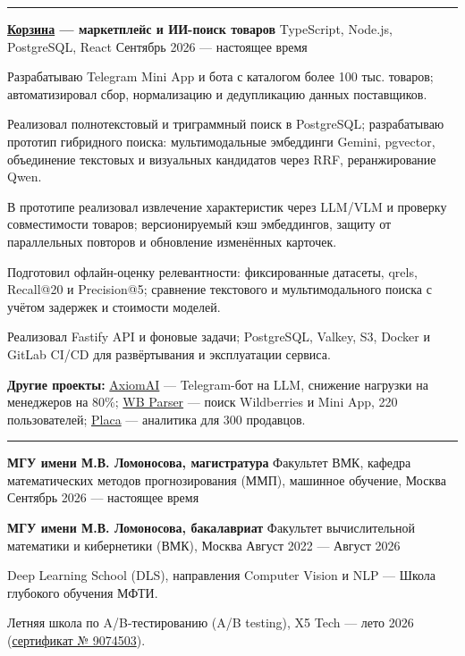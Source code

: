 \documentclass[10pt,a4paper]{article}
\newcommand{\cvsection}[1]{%
  \vspace{5pt}{\large\bfseries #1}\par\vspace{2pt}\hrule\vspace{4pt}}
\newcommand{\cventry}[3]{%
  \textbf{#1} \textbar{} #3 \textbar{} #2\par\vspace{1pt}}
\begin{document}
\cvsection{Проекты}
\cventry{\href{https://github.com/noobmaster-ru/korzina-market}{Корзина} --- маркетплейс и ИИ-поиск товаров}{Сентябрь 2026 --- настоящее время}{TypeScript, Node.js, PostgreSQL, React}
\begin{cvitems}
    \item Разрабатываю Telegram Mini App и бота с каталогом более 100 тыс. товаров; автоматизировал сбор, нормализацию и дедупликацию данных поставщиков.
    \item Реализовал полнотекстовый и триграммный поиск в PostgreSQL; разрабатываю прототип гибридного поиска: мультимодальные эмбеддинги Gemini, pgvector, объединение текстовых и визуальных кандидатов через RRF, реранжирование Qwen.
    \item В прототипе реализовал извлечение характеристик через LLM/VLM и проверку совместимости товаров; версионируемый кэш эмбеддингов, защиту от параллельных повторов и обновление изменённых карточек.
    \item Подготовил офлайн-оценку релевантности: фиксированные датасеты, qrels, Recall@20 и Precision@5; сравнение текстового и мультимодального поиска с учётом задержек и стоимости моделей.
    \item Реализовал Fastify API и фоновые задачи; PostgreSQL, Valkey, S3, Docker и GitLab CI/CD для развёртывания и эксплуатации сервиса.
\end{cvitems}
\textbf{Другие проекты:} \href{https://github.com/noobmaster-ru/axiomai}{AxiomAI} --- Telegram-бот на LLM, снижение нагрузки на менеджеров на 80\%; \href{https://github.com/noobmaster-ru/tg-mini-app-backend}{WB Parser} --- поиск Wildberries и Mini App, 220 пользователей; \href{https://github.com/noobmaster-ru/wb_tables}{Placa} --- аналитика для 300 продавцов.\par

\cvsection{Образование}
\cventry{МГУ имени М.В. Ломоносова, магистратура}{Сентябрь 2026 --- настоящее время}{Факультет ВМК, кафедра математических методов прогнозирования (ММП), машинное обучение, Москва}
\vspace{2pt}
\cventry{МГУ имени М.В. Ломоносова, бакалавриат}{Август 2022 --- Август 2026}{Факультет вычислительной математики и кибернетики (ВМК), Москва}
\begin{cvitems}
    \item Deep Learning School (DLS), направления Computer Vision и NLP --- Школа глубокого обучения МФТИ.
    \item Летняя школа по A/B-тестированию (A/B testing), X5 Tech --- лето 2026 (\href{https://disk.yandex.ru/i/5rZXupCvo3hMTw}{сертификат № 9074503}).
\end{cvitems}
\end{document}
